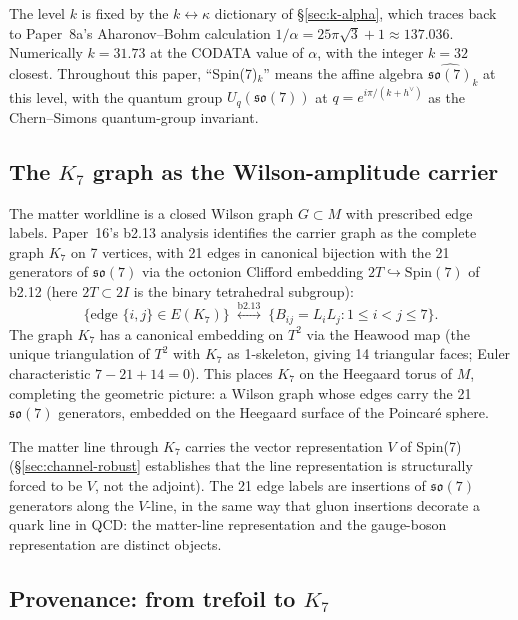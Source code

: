 \documentclass[11pt]{article}
\newcommand{\so}{\mathfrak{so}}
\newcommand{\Spin}{\mathrm{Spin}}
\newcommand{\hv}{h^{\vee}}
\begin{document}
The level $k$ is fixed by the $k \leftrightarrow \kappa$ dictionary
of \S\ref{sec:k-alpha}, which traces back to Paper~8a's
Aharonov--Bohm calculation
$1/\alpha = 25\pi\sqrt{3} + 1 \approx 137.036$.  Numerically
$k = 31.73$ at the CODATA value of $\alpha$, with the integer
$k = 32$ closest.  Throughout this paper, ``Spin(7)$_k$'' means
the affine algebra $\widehat{\so(7)}_k$ at this level, with the
quantum group $U_q(\so(7))$ at $q = e^{i\pi/(k+\hv)}$ as the
Chern--Simons quantum-group invariant.

\subsection{The $K_7$ graph as the Wilson-amplitude carrier}
\label{sec:k7-as-carrier}

The matter worldline is a closed Wilson graph $G \subset M$ with
prescribed edge labels.  Paper~16's b2.13 analysis identifies
the carrier graph as the complete graph $K_7$ on 7 vertices, with
21 edges in canonical bijection with the 21 generators of $\so(7)$
via the octonion Clifford embedding $2T \hookrightarrow \Spin(7)$
of b2.12 (here $2T \subset 2I$ is the binary tetrahedral subgroup):
\begin{equation}
  \{ \text{edge } \{i,j\} \in E(K_7) \}
  \;\stackrel{\text{b2.13}}{\longleftrightarrow}\;
  \{ B_{ij} = L_i L_j : 1 \le i < j \le 7 \}.
\end{equation}
The graph $K_7$ has a canonical embedding on $T^2$ via the Heawood
map (the unique triangulation of $T^2$ with $K_7$ as 1-skeleton,
giving 14 triangular faces; Euler characteristic
$7 - 21 + 14 = 0$).  This places $K_7$ on the Heegaard torus of
$M$, completing the geometric picture: a Wilson graph whose edges
carry the 21 $\so(7)$ generators, embedded on the Heegaard surface
of the Poincar\'e sphere.

The matter line through $K_7$ carries the vector representation $V$
of Spin(7) (\S\ref{sec:channel-robust} establishes that the line
representation is structurally forced to be $V$, not the adjoint).
The 21 edge labels are insertions of $\so(7)$ generators along the
$V$-line, in the same way that gluon insertions decorate a quark
line in QCD: the matter-line representation and the gauge-boson
representation are distinct objects.

\subsection{Provenance: from trefoil to $K_7$}
\label{sec:trefoil-to-k7}
\end{document}
